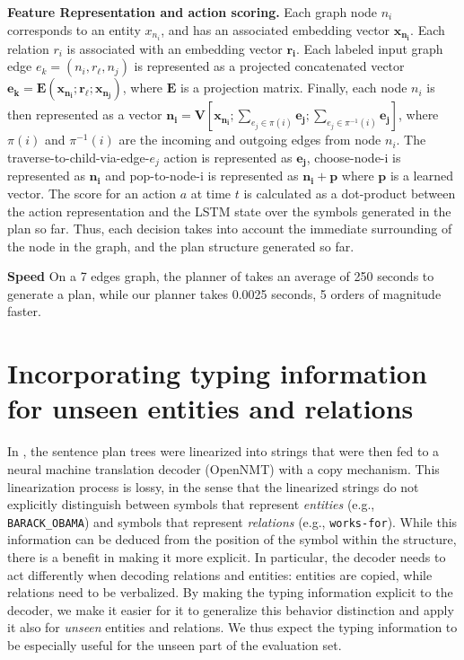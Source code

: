 \documentclass[11pt,a4paper,table,xcdraw]{article}
\newcommand{\am}[1]{\textcolor{blue}{[AM:#1]}}
\begin{document}
\noindent\textbf{Feature Representation and action scoring.}
Each graph node $n_i$ corresponds to an entity $x_{n_i}$, and has an associated embedding vector $\mathbf{x_{n_i}}$. Each relation $r_i$ is associated with an embedding vector $\mathbf{r_i}$. Each labeled input graph edge $e_k = (n_i, r_\ell, n_j)$ is represented as a projected concatenated vector $\mathbf{e_k}=\mathbf{E}(\mathbf{x_{n_i}};\mathbf{r_\ell};\mathbf{x_{n_j}})$, where $\mathbf{E}$ is a projection matrix. Finally,   each node $n_i$ is then represented as a vector $\mathbf{n_i} = \mathbf{V}[\mathbf{x_{n_i}};\sum_{e_j\in \pi(i)}\mathbf{e_j};\sum_{e_j\in\pi^{-1}(i)}\mathbf{e_j}]$, where $\pi(i)$ and $\pi^{-1}(i)$ are the incoming and outgoing edges from node $n_i$. 
The traverse-to-child-via-edge-$e_j$ action is represented as $\mathbf{e_j}$, choose-node-i is represented as $\mathbf{n_i}$ and pop-to-node-i is represented as $\mathbf{n_i}+\mathbf{p}$ where $\mathbf{p}$ is a learned vector. The score for an action $a$ at time $t$ is calculated as a dot-product between the action representation and the LSTM state over the symbols generated in the plan so far. Thus, each decision takes into account the immediate surrounding of the node in the graph, and the plan structure generated so far.

\noindent\textbf{Speed} On a 7 edges graph, the planner of \citet{step-by-step} takes an average of 250 seconds %
to generate a plan, while our planner takes 0.0025 seconds, 5 orders of magnitude faster.

\section{Incorporating typing information for unseen entities and relations}
\label{sec:types}
In \citet{step-by-step}, the sentence plan trees were linearized into strings that were then fed to a neural machine translation decoder (OpenNMT) \cite{klein2017opennmt} with a copy mechanism. This linearization process is lossy, in the sense that the linearized strings do not explicitly distinguish between symbols that represent \emph{entities} (e.g., \texttt{BARACK\_OBAMA}) and symbols that represent \emph{relations} (e.g., \texttt{works-for}). While this information can be deduced from the position of the symbol within the structure, there is a benefit in making it more explicit. In particular, the decoder needs to act differently when decoding relations and entities: entities are copied, while relations need to be verbalized. By making the typing information explicit to the decoder, we make it easier for it to generalize this behavior distinction and apply it also for \emph{unseen} entities and relations.  We thus expect the typing information to be especially useful for the unseen part of the evaluation set.
\end{document}
